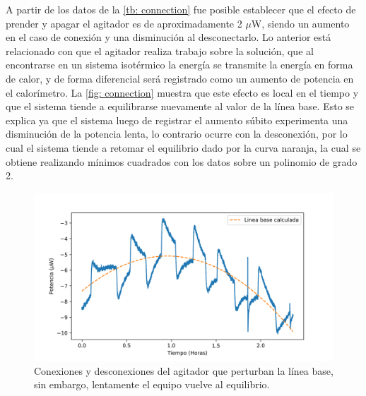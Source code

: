 	A partir de los datos de la \autoref{tb: connection} fue posible establecer que el efecto de prender y apagar el agitador es de aproximadamente 2 $\mu$W, siendo un aumento en el caso de conexión y una disminución al desconectarlo. Lo anterior est\'a relacionado con que el agitador realiza trabajo sobre la solución, que al encontrarse en un sistema isotérmico la energía se transmite la energ\'ia en forma de calor, y de forma diferencial será registrado como un aumento de potencia en el calorímetro. La \autoref{fig: connection} muestra que este efecto es local en el tiempo y que el sistema tiende a equilibrarse nuevamente al valor de la línea base. Esto se explica ya que el sistema luego de registrar el aumento súbito experimenta una disminución de la potencia lenta, lo contrario ocurre con la desconexión, por lo cual el sistema tiende a retomar el equilibrio dado por la curva naranja, la cual se obtiene realizando mínimos cuadrados con los datos sobre un polinomio de grado 2.
	\begin{figure}[h]
		\centering
		\includegraphics[width=\linewidth]{../Data/Baselines/motor}
		\caption{Conexiones y desconexiones del agitador que perturban la línea base, sin embargo, lentamente el equipo vuelve al equilibrio.}
		\label{fig: connection}
	\end{figure}	